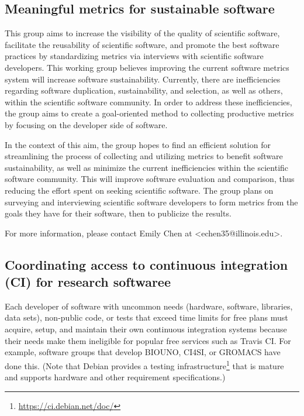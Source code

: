 \documentclass[11pt, oneside]{amsart}
\newcommand{\note}[1]{ {\textcolor{blueish}    { ***Note:      #1 }}}
\begin{document}
\subsection{Meaningful metrics for sustainable software}
\label{sec:metrics}


This group aims to increase the visibility of the quality of scientific software, facilitate the reusability of scientific software, and promote the best software practices by standardizing metrics via interviews with scientific software developers. This working group believes improving the current software metrics system will increase software sustainability. Currently, there are inefficiencies regarding software duplication, sustainability, and selection, as well as others, within the scientific software community. In order to address these inefficiencies, the group aims to create a goal-oriented method to collecting productive metrics by focusing on the developer side of software.

In the context of this aim, the group hopes to find an efficient solution for streamlining the process of collecting and utilizing metrics to benefit software sustainability, as well as minimize the current inefficiencies within the scientific software community. This will improve software evaluation and comparison, thus reducing the effort spent on seeking scientific software.
%
The group plans on surveying and interviewing scientific software developers to form metrics from the goals they have for their software, then to publicize the results.

For more information, please contact Emily Chen at <echen35@illinois.edu>.



\subsection{Coordinating access to continuous integration (CI) for research softwaree}
\label{sec:access}


Each developer of software with uncommon needs (hardware, software, libraries, data sets), non-public code, or tests that exceed time limits for free plans must acquire, setup, and maintain their own continuous integration systems because their needs make them ineligible for popular free services such as Travis CI.  For example, software groups that develop BIOUNO, CI4SI, or GROMACS have done this.
(Note that Debian provides a testing infrastructure\footnote{\url{https://ci.debian.net/doc/}} that is mature and supports hardware and other requirement specifications.)
\end{document}
